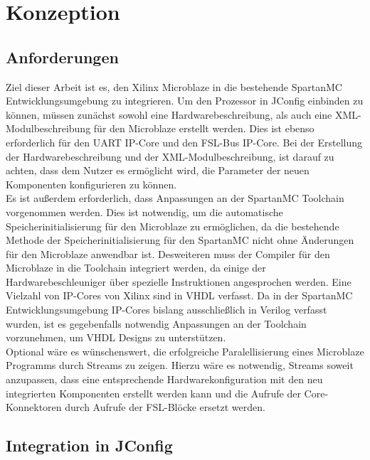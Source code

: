\chapter{Konzeption}
\section{Anforderungen}
Ziel dieser Arbeit ist es, den Xilinx Microblaze in die bestehende SpartanMC Entwicklungsumgebung zu integrieren. Um den Prozessor in JConfig einbinden zu können, müssen zunächst sowohl eine Hardwarebeschreibung, als auch eine XML-Modulbeschreibung für den Microblaze erstellt werden. Dies ist ebenso erforderlich für den UART IP-Core und den FSL-Bus IP-Core. Bei der Erstellung der Hardwarebeschreibung und der XML-Modulbeschreibung, ist darauf zu achten, dass dem Nutzer es ermöglicht wird, die Parameter der neuen Komponenten konfigurieren zu können.\\
Es ist außerdem erforderlich, dass Anpassungen an der SpartanMC Toolchain vorgenommen werden. Dies ist notwendig, um die automatische Speicherinitialisierung für den Microblaze zu ermöglichen, da die bestehende Methode der Speicherinitialisierung für den SpartanMC nicht ohne Änderungen für den Microblaze anwendbar ist. Desweiteren muss der Compiler für den Microblaze in die Toolchain integriert werden, da einige der Hardwarebeschleuniger über spezielle Instruktionen angesprochen werden. Eine Vielzahl von IP-Cores von Xilinx sind in VHDL verfasst. Da in der SpartanMC Entwicklungsumgebung IP-Cores bislang ausschließlich in Verilog verfasst wurden, ist es gegebenfalls notwendig Anpassungen an der Toolchain vorzunehmen, um VHDL Designs zu unterstützen.\\
Optional wäre es wünschenswert, die erfolgreiche Paralellisierung eines Microblaze Programms durch \textmu\/Streams zu zeigen. Hierzu wäre es notwendig, 
\textmu\/Streams soweit anzupassen, dass eine entsprechende Hardwarekonfiguration mit den neu integrierten Komponenten erstellt werden kann und
die Aufrufe der Core-Konnektoren durch Aufrufe der FSL-Blöcke ersetzt werden.
\section{Integration in JConfig}
